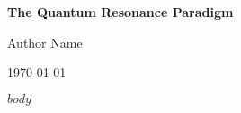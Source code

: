 \documentclass{article}
\begin{document}
\begin{titlepage}
    \centering
    \vspace*{2cm}
    {\Huge\bfseries The Quantum Resonance Paradigm\par}
    \vspace{1cm}
    {\Large Author Name\par}
    \vfill
    {\large \today\par}
\end{titlepage}

\tableofcontents
\newpage

%


$body$
\end{document}
